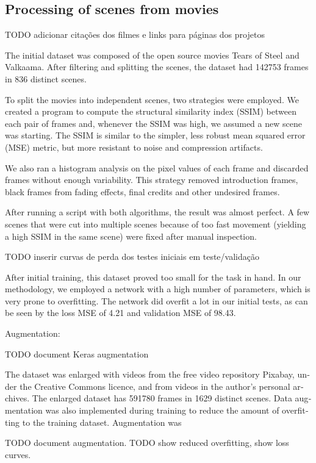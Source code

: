 \documentclass[12pt,openright,twoside,a4paper,english]{abntex2}
\begin{document}
\begin{otherlanguage}{english}
\subsection{Processing of scenes from movies}
TODO adicionar citações dos filmes e links para páginas dos projetos

The initial dataset was composed of the open source movies Tears of Steel and Valkaama. After filtering and splitting the scenes, the dataset had 142753 frames in 836 distinct scenes.

To split the movies into independent scenes, two strategies were employed. We created a program to compute the structural similarity index (SSIM) between each pair of frames and, whenever the SSIM was high, we assumed a new scene was starting. The SSIM is similar to the simpler, less robust mean squared error (MSE) metric, but more resistant to noise and compression artifacts.

We also ran a histogram analysis on the pixel values of each frame and discarded frames without enough variability. This strategy removed introduction frames, black frames from fading effects, final credits and other undesired frames.

After running a script with both algorithms, the result was almost perfect. A few scenes that were cut into multiple scenes because of too fast movement (yielding a high SSIM in the same scene) were fixed after manual inspection.

TODO inserir curvas de perda dos testes iniciais em teste/validação

After initial training, this dataset proved too small for the task in hand. In our methodology, we employed a network with a high number of parameters, which is very prone to overfitting. The network did overfit a lot in our initial tests, as can be seen by the loss MSE of 4.21 and validation MSE of 98.43.

Augmentation:

TODO document Keras augmentation

The dataset was enlarged with videos from the free video repository Pixabay, under the Creative Commons licence, and from videos in the author's personal archives. The enlarged dataset has 591780 frames in 1629 distinct scenes. Data augmentation was also implemented during training to reduce the amount of overfitting to the training dataset. Augmentation was

TODO document augmentation. TODO show reduced overfitting, show loss curves.


\end{otherlanguage}
\end{document}
